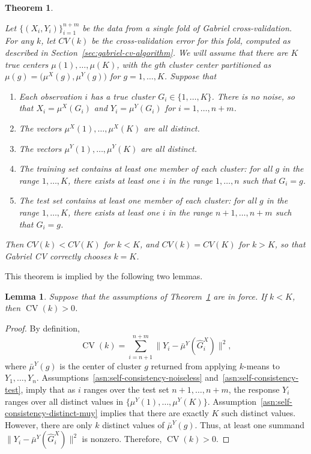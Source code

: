 \documentclass[11pt]{article}
\newtheorem{theorem}{Theorem}
\newtheorem{lemma}{Lemma}
\newcommand{\CV}{\operatorname{CV}}
\newcommand{\muX}{\mu^{X}}
\newcommand{\muY}{\mu^{Y}}
\newcommand{\bmuY}{\bar \mu^{Y}}
\newcommand{\hGX}{\hat G^{X}}
\begin{document}
\begin{theorem}\label{thm:self-consistency}

Let $\{ (X_i, Y_i) \}_{i=1}^{n+m}$ be the data from a single fold of Gabriel
cross-validation.  For any $k$, let $CV(k)$ be the cross-validation error for
this fold, computed as described in Section~\ref{sec:gabriel-cv-algorithm}.
We will assume that there are $K$ true centers $\mu(1), \dotsc,\mu(K)$, with
the $g$th cluster center partitioned as $\mu(g) = \bigl(\muX(g),
\muY(g)\bigr)$ for $g = 1, \dotsc, K$.  Suppose that
\begin{enumerate}[label=(\roman*)]
  \item \label{asn:self-consistency-noiseless}
    Each observation $i$ has a true cluster $G_i \in \{ 1, \dotsc, K \}$.
    There is no noise, so that $X_i = \muX({G_i})$ and $Y_i = \muY(G_i)$ for
    $i = 1, \dotsc, n+m$.

  \item \label{asn:self-consistency-distinct-mux}
    The vectors $\muX(1), \dotsc,\muX(K)$ are all distinct.

  \item \label{asn:self-consistency-distinct-muy}
    The vectors $\muY(1), \dotsc,\muY(K)$ are all distinct.

  \item \label{asn:self-consistency-train}
    The training set contains at least one member of each cluster: for all $g$
    in the range $1, \dotsc, K$, there exists at least one $i$ in the range
    $1, \dotsc, n$ such that $G_i = g$.

  \item \label{asn:self-consistency-test}
    The test set contains at least one member of each cluster: for all $g$ in
    the range $1, \dotsc, K$, there exists at least one $i$ in the range $n+1,
    \dotsc, n+m$ such that $G_i = g$.

\end{enumerate}
Then $CV(k) < CV(K)$ for $k < K$, and $CV(k) = CV(K)$ for $k > K$, so that
Gabriel CV correctly chooses $k = K$.
\end{theorem}

This theorem is implied by the following two lemmas.

\begin{lemma}
Suppose that the assumptions of Theorem~\ref{thm:self-consistency} are in
force.  If $k < K$, then $\CV(k) > 0$.
\end{lemma}
\begin{proof}
By definition,
\[
  \CV(k)
    =
      \sum_{i=n+1}^{n+m}
        \| Y_i - \bmuY (\hGX_i) \|^2,
\]
where $\bmuY(g)$ is the center of cluster $g$ returned from applying $k$-means
to $Y_1, \dotsc, Y_n$.  Assumptions~\ref{asn:self-consistency-noiseless}
and~\ref{asn:self-consistency-test}, imply that as $i$ ranges over the test
set $n+1, \dotsc, n+m$, the response $Y_i$ ranges over all distinct values in
$\{ \muY(1), \dotsc, \muY(K) \}$.
Assumption~\ref{asn:self-consistency-distinct-muy} implies that there are
exactly $K$ such distinct values.  However, there are only $k$ distinct values
of $\bmuY(g)$.  Thus, at least one summand
\(
  \| Y_i - \bmuY(\hGX_i) \|^2
\)
is nonzero.  Therefore,
\(
  \CV(k) > 0.
\)
\end{proof}
\end{document}
